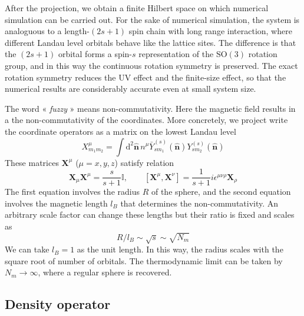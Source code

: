 \documentclass{timesjhep}
\begin{document}
After the projection, we obtain a finite Hilbert space on which numerical simulation can be carried out. For the sake of numerical simulation, the system is analoguous to a length-$(2s+1)$ spin chain with long range interaction, where different Landau level orbitals behave like the lattice sites. The difference is that the $(2s+1)$ orbital forms a spin-$s$ representation of the $\mathrm{SO}(3)$ rotation group, and in this way the continuous rotation symmetry is preserved. The exact rotation symmetry reduces the UV effect and the finite-size effect, so that the numerical results are considerably accurate even at small system size. 

The word « \textit{fuzzy} » means non-commutativity. Here the magnetic field results in a the non-commutativity of the coordinates. More concretely, we project write the coordinate operators as a matrix on the lowest Landau level 
\begin{equation}
    X^\mu_{m_1m_2}=\int\mathrm{d}^2\hat{\mathbf{n}}\,n^\mu \bar{Y}_{sm_1}^{(s)}(\hat{\mathbf{n}})Y_{sm_2}^{(s)}(\hat{\mathbf{n}})
\end{equation}
These matrices $\mathbf{X}^\mu$ ($\mu=x,y,z$) satisfy relation 
\begin{equation}
    \mathbf{X}_\mu\mathbf{X}^\mu=\frac{s}{s+1}\mathbb{I},\qquad [\mathbf{X}^\mu,\mathbf{X}^\nu]=\frac{1}{s+1}i\epsilon^{\mu\nu\rho}\mathbf{X}_\rho
\end{equation}
The first equation involves the radius $R$ of the sphere, and the second equation involves the magnetic length $l_B$ that determines the non-commutativity. An arbitrary scale factor can change these lengths but their ratio is fixed and scales as 
\begin{equation}
    R/l_B\sim\sqrt{s}\sim\sqrt{N_m}
\end{equation} 
We can take $l_B=1$ as the unit length. In this way, the radius scales with the square root of number of orbitals. The thermodynamic limit can be taken by $N_m\to\infty$, where a regular sphere is recovered. 

\subsection{Density operator}
\label{sec:construct_den}
\end{document}
